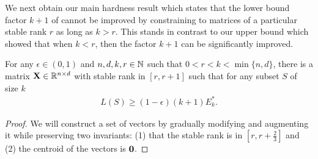 \documentclass[12pt]{sty/colt2019/colt2018-arxiv}
\begin{document}
We next obtain our main hardness result which states that the lower bound
factor $k+1$ of \cite{pca-volume-sampling} cannot be improved by constraining to matrices of a
particular stable rank $r$ as long as $k>r$. This stands in contrast
to our upper bound which showed that when $k<r$, then the factor $k+1$
can be significantly improved.
\begin{theorem}
For any $\epsilon\in(0,1)$ and $n,d,k,r\in\mathbb N$ such that  $0<r< k<\min\{n,d\}$, there is a matrix
$\mathbf X\in\mathbb R^{n\times d}$ with stable rank in $[r,r+1]$ such that for any subset
$S$ of size $k$
\begin{align*}
  L(S)\geq (1-\epsilon)(k+1) E_k^*.
  \end{align*}
\end{theorem}
\begin{proof}
  We will construct a set of vectors by gradually modifying and augmenting it while
  preserving two invariants: (1) that the stable rank is in $[r,r+\frac23]$
  and (2) the centroid of the vectors is  $\mathbf 0$. 
  

\end{proof}
\end{document}
